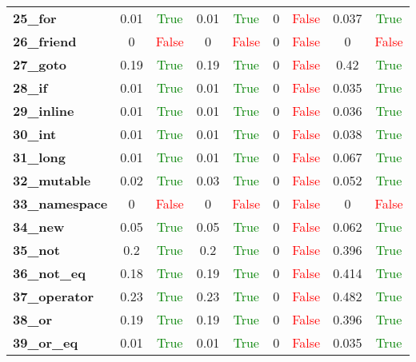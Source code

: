 \documentclass{article}
\begin{document}
\begin{xltabular}{\textwidth}{lcccccccc}
\textbf{25\_for}& 0.01&\textcolor{green}{True}& 0.01&\textcolor{green}{True}& 0&\textcolor{red}{False}& 0.037&\textcolor{green}{True} \\[0.5ex]
\textbf{26\_friend}& 0&\textcolor{red}{False}& 0&\textcolor{red}{False}& 0&\textcolor{red}{False}& 0&\textcolor{red}{False} \\[0.5ex]
\textbf{27\_goto}& 0.19&\textcolor{green}{True}& 0.19&\textcolor{green}{True}& 0&\textcolor{red}{False}& 0.42&\textcolor{green}{True} \\[0.5ex]
\textbf{28\_if}& 0.01&\textcolor{green}{True}& 0.01&\textcolor{green}{True}& 0&\textcolor{red}{False}& 0.035&\textcolor{green}{True} \\[0.5ex]
\textbf{29\_inline}& 0.01&\textcolor{green}{True}& 0.01&\textcolor{green}{True}& 0&\textcolor{red}{False}& 0.036&\textcolor{green}{True} \\[0.5ex]
\textbf{30\_int}& 0.01&\textcolor{green}{True}& 0.01&\textcolor{green}{True}& 0&\textcolor{red}{False}& 0.038&\textcolor{green}{True} \\[0.5ex]
\textbf{31\_long}& 0.01&\textcolor{green}{True}& 0.01&\textcolor{green}{True}& 0&\textcolor{red}{False}& 0.067&\textcolor{green}{True} \\[0.5ex]
\textbf{32\_mutable}& 0.02&\textcolor{green}{True}& 0.03&\textcolor{green}{True}& 0&\textcolor{red}{False}& 0.052&\textcolor{green}{True} \\[0.5ex]
\textbf{33\_namespace}& 0&\textcolor{red}{False}& 0&\textcolor{red}{False}& 0&\textcolor{red}{False}& 0&\textcolor{red}{False} \\[0.5ex]
\textbf{34\_new}& 0.05&\textcolor{green}{True}& 0.05&\textcolor{green}{True}& 0&\textcolor{red}{False}& 0.062&\textcolor{green}{True} \\[0.5ex]
\textbf{35\_not}& 0.2&\textcolor{green}{True}& 0.2&\textcolor{green}{True}& 0&\textcolor{red}{False}& 0.396&\textcolor{green}{True} \\[0.5ex]
\textbf{36\_not\_eq}& 0.18&\textcolor{green}{True}& 0.19&\textcolor{green}{True}& 0&\textcolor{red}{False}& 0.414&\textcolor{green}{True} \\[0.5ex]
\textbf{37\_operator}& 0.23&\textcolor{green}{True}& 0.23&\textcolor{green}{True}& 0&\textcolor{red}{False}& 0.482&\textcolor{green}{True} \\[0.5ex]
\textbf{38\_or}& 0.19&\textcolor{green}{True}& 0.19&\textcolor{green}{True}& 0&\textcolor{red}{False}& 0.396&\textcolor{green}{True} \\[0.5ex]
\textbf{39\_or\_eq}& 0.01&\textcolor{green}{True}& 0.01&\textcolor{green}{True}& 0&\textcolor{red}{False}& 0.035&\textcolor{green}{True} \\[0.5ex]

\end{xltabular}
\end{document}
